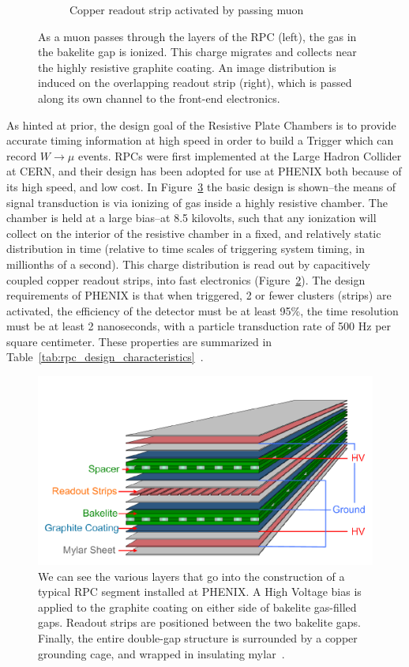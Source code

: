 \begin{figure}
\begin{subfigure}[b]{0.4\textwidth}
    \caption{Copper readout strip activated by passing muon}
    \label{fig:rpc_hit_top_view}
  \end{subfigure}
  \caption{
    As a muon passes through the layers of the RPC (left), the gas in the
    bakelite gap is ionized. This charge migrates and collects near the highly
    resistive graphite coating. An image distribution is induced on the
    overlapping readout strip (right), which is passed along its own channel to
    the front-end electronics.
  }
  \label{fig:muon_hit_rpc}
\end{figure}

As hinted at prior, the design goal of the Resistive Plate Chambers is to
provide accurate timing information at high speed in order to build a Trigger
which can record $W\rightarrow\mu$ events. RPCs were first implemented at the
Large Hadron Collider at CERN, and their design has been adopted for use at
PHENIX both because of its high speed, and low cost. In
Figure~\ref{fig:rpc_exploded} the basic design is shown--the means of signal
transduction is via ionizing of gas inside a highly resistive chamber. The
chamber is held at a large bias--at 8.5 kilovolts, such that any ionization
will collect on the interior of the resistive chamber in a fixed, and relatively
static distribution in time (relative to time scales of triggering system
timing, in millionths of a second). This charge distribution is read out by
capacitively coupled copper readout strips, into fast electronics
(Figure~\ref{fig:muon_hit_rpc}). The design requirements of PHENIX is that when
triggered, 2 or fewer clusters (strips) are activated, the efficiency of the
detector must be at least 95\%, the time resolution must be at least 2
nanoseconds, with a particle transduction rate of 500 Hz per square centimeter.
These properties are summarized in
Table~\ref{tab:rpc_design_characteristics}~\cite{Fukao2011}.

\begin{figure}[ht]
  \centering
  \includegraphics[width=0.7\linewidth]{./figures/rpc_exploded.png}
  \caption{
    We can see the various layers that go into the construction of a typical RPC
    segment installed at PHENIX. A High Voltage bias is applied to the graphite
    coating on either side of bakelite gas-filled gaps. Readout strips are
    positioned between the two bakelite gaps. Finally, the entire double-gap
    structure is surrounded by a copper grounding cage, and wrapped in
    insulating mylar~\cite{Fukao2011}.
  }
  \label{fig:rpc_exploded}
\end{figure}

